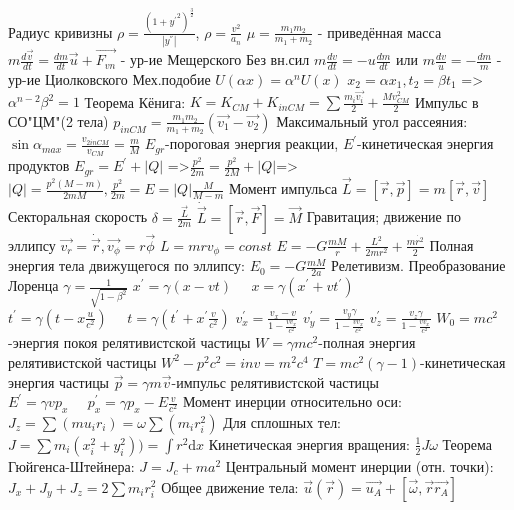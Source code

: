 \documentclass[10pt,a4paper]{article}
\author{Глотов Алексей}
\begin{document}
\newpage
\begin{flushleft}
Радиус кривизны $\rho=\frac{(1+{y^{'}}^2)^\frac{3}{2}}{|y^{''}|}$, $\rho=\frac{v^2}{a_{n}}$ \break
$\mu=\frac{m_{1}m_{2}}{m_{1}+m_{2}}$ - приведённая масса \break
$m\frac{d\vec{v}}{dt}=\frac{dm}{dt} \vec{u}+\vec{F_{vn}}$ - ур-ие Мещерского \break
Без вн.сил $m\frac{{dv}}{dt}=-u\frac{dm}{dt}$\; или \; $m\frac{dv}{u}=-\frac{dm}{m}$ - ур-ие Циолковского\break
Мех.подобие $U(\alpha{x})=\alpha^nU(x)$   
$x_{2}=\alpha{x_{1}}, t_{2}=\beta{t_{1}}$ => $\alpha^{n-2}\beta^2=1$ \break
Теорема Кёнига: $K=K_{CM}+K_{inCM}=\sum\frac{m_{i}\vec{v_{i}}}{2}+\frac{Mv_{CM}^2}{2}$ \break
Импульс в СО"ЦМ"(2 тела) $p_{inCM}=\frac{m_{1}m_{2}}{m_{1}+m_{2}}(\vec{v_{1}}-\vec{v_{2}})$ \break
Максимальный угол рассеяния: $\sin\alpha_{max}=\frac{v_{2inCM}}{v_{CM}} =\frac{m}{M}$ \break
$E_{gr}$-пороговая энергия реакции, $E^{'}$-кинетическая энергия продуктов \break
$E_{gr}=E^{'}+|Q|$ =>$\frac{p^2}{2m}=\frac{p^2}{2M}+|Q|$=>$|Q|=\frac{p^{2}(M-m)}{2mM}, \frac{p^2}{2m}=E=|Q|\frac{M}{M-m}$ \break
Момент импульса $\vec{L}=[\vec{r},\vec{p}]=m[\vec{r},\vec{v}]$
\break
Секторальная скорость $\delta=\frac{\vec{L}}{2m}$ \break
$\dot{\vec{L}}=[\vec{r},\vec{F}]=\vec{M}$ \break
Гравитация; движение по эллипсу 
$\vec{v_{r}}=\dot{\vec{r}}, \vec{v_{\phi}}=r\vec{\phi}$ $L=mrv_{\phi}=const$ \break
$E=-G\frac{mM}{r}+\frac{L^2}{2mr^2}+\frac{m\dot{r^2}}{2}$ \break
Полная энергия тела движущегося по эллипсу: $E_{0}=-G\frac{mM}{2a}$ \break
Релетивизм. Преобразование Лоренца $\gamma=\frac{1}{\sqrt{1-\beta^2}}$ \break
$x^{'}=\gamma(x-vt)\;\;\;\;\; x=\gamma(x^{'}+vt^{'})$\break
$t^{'}=\gamma(t-x\frac{u}{c^2}) \;\;\;\;\; t=\gamma(t^{'}+x^{'}\frac{v}{c^2})$ \break
$v_{x}^{'}=\frac{v_{x}-v}{1-\frac{vv_{x}}{c^2}}$
$v_{y}^{'}=\frac{v_{y}\gamma}{1-\frac{vv_{x}}{c^2}}$
$v_{z}^{'}=\frac{v_{z}\gamma}{1-\frac{vv_{x}}{c^2}}$\break
$W_{0}=mc^2$-энергия покоя релятивистской частицы \break
$W=\gamma{mc^2}$-полная энергия релятивистской частицы\break
$W^2-p^2c^2=inv=m^2c^4$\break
$T=mc^2(\gamma-1)$-кинетическая энергия частицы\break
$\vec{p}=\gamma{m\vec{v}}$-импульс релятивистской частицы \break
$E^{'}=\gamma{vp_{x}} \;\;\;\;\; p_{x}^{'}=\gamma{p_{x}-E\frac{v}{c^2}}$\break
Момент инерции относительно оси: $J_{z}=\sum(mu_{i}r_{i})=\omega\sum(m_{i}r^{2}_{i})$ \break
Для сплошных тел: $J=\sum{m_{i}(x^{2}_{i}+y^{2}_{i})})=\int{r^2\mathrm{d}x}$ \break
Кинетическая энергия вращения: $\frac{1}{2}J\omega$ \break
Теорема Гюйгенса-Штейнера: $J=J_{c}+ma^2$ \break
Центральный момент инерции (отн. точки): $J_{x}+J_{y}+J_{z}=2\sum{m_{i}r^{2}_{i}}$ \break
Общее движение тела: $\vec{u}(\vec{r})=\vec{u_{A}}+[\vec{\omega}, \vec{r}\vec{r_{A}}]$ \break

\end{flushleft}
\end{document}
